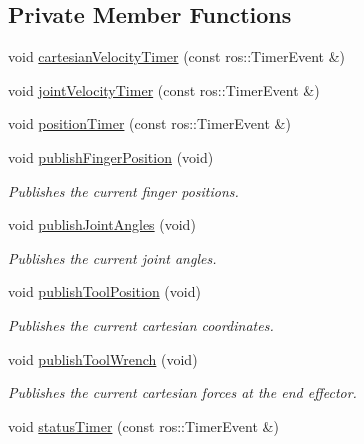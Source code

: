 \subsection*{Private Member Functions}
\begin{DoxyCompactItemize}
\item 
void \hyperlink{classjaco_1_1JacoArm_a0effe31602b4af803cff1566a358fdfb}{cartesian\+Velocity\+Timer} (const ros\+::\+Timer\+Event \&)
\item 
void \hyperlink{classjaco_1_1JacoArm_a0897025ed2834e5802e504b64d67a88b}{joint\+Velocity\+Timer} (const ros\+::\+Timer\+Event \&)
\item 
void \hyperlink{classjaco_1_1JacoArm_ac9feee593db40584276b22f7db03206e}{position\+Timer} (const ros\+::\+Timer\+Event \&)
\item 
void \hyperlink{classjaco_1_1JacoArm_a978feb8b29f9ef7d6d42596984e1962a}{publish\+Finger\+Position} (void)
\begin{DoxyCompactList}\small\item\em Publishes the current finger positions. \end{DoxyCompactList}\item 
void \hyperlink{classjaco_1_1JacoArm_a238a888aa46e98fcae569bf942d61e32}{publish\+Joint\+Angles} (void)
\begin{DoxyCompactList}\small\item\em Publishes the current joint angles. \end{DoxyCompactList}\item 
void \hyperlink{classjaco_1_1JacoArm_a91106f68edeff4b26d02a6d7a8528df6}{publish\+Tool\+Position} (void)
\begin{DoxyCompactList}\small\item\em Publishes the current cartesian coordinates. \end{DoxyCompactList}\item 
void \hyperlink{classjaco_1_1JacoArm_a91d14ff9734d5941167ba0ec13ec3e36}{publish\+Tool\+Wrench} (void)
\begin{DoxyCompactList}\small\item\em Publishes the current cartesian forces at the end effector. \end{DoxyCompactList}\item 
void \hyperlink{classjaco_1_1JacoArm_a3a04586ffe92b995c58c9fa94a030bf8}{status\+Timer} (const ros\+::\+Timer\+Event \&)
\end{DoxyCompactItemize}
